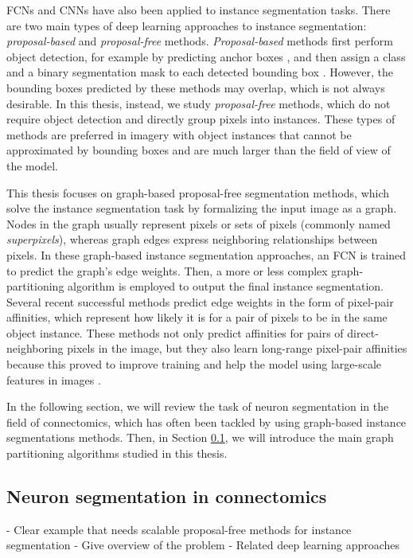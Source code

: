 FCNs and CNNs have also been applied to instance segmentation tasks.
There are two main types of deep learning approaches to instance segmentation: \emph{proposal-based} and \emph{proposal-free} methods. 
\emph{Proposal-based} methods first perform object detection, for example by predicting anchor boxes \cite{ren2015faster}, and then assign a class and a binary segmentation mask to each detected bounding box \cite{he2017mask,porzi2019seamless}.
However, the bounding boxes predicted by these methods may overlap, which is not always desirable. 
In this thesis, instead, we study \emph{proposal-free} methods, which do not require object detection and directly group pixels into instances. 
These types of methods are preferred in imagery with object instances that cannot be approximated by bounding boxes and are much larger than the field of view of the model. 

This thesis focuses on graph-based proposal-free segmentation methods, which solve the instance segmentation task by formalizing the input image as a graph. Nodes in the graph usually represent pixels or sets of pixels (commonly named \emph{superpixels}), whereas graph edges express neighboring relationships between pixels. In these graph-based instance segmentation approaches, an FCN is trained to predict the graph's edge weights. Then, a more or less complex graph-partitioning algorithm is employed to output the final instance segmentation. 
Several recent successful methods \cite{Gao_2019_ICCV,liu2018affinity,lee2017superhuman} predict edge weights in the form of pixel-pair affinities, which represent how likely it is for a pair of pixels to be in the same object instance. These methods not only predict affinities for pairs of direct-neighboring pixels in the image, but they also learn long-range pixel-pair affinities because this proved to improve training and help the model using large-scale features in images \cite{lee2017superhuman}.

In the following section, we will review the task of neuron segmentation in the field of connectomics, which has often been tackled by using graph-based instance segmentations methods. Then, in Section \ref{}, we will introduce the main graph partitioning algorithms studied in this thesis.



 
\subsection{Neuron segmentation in connectomics}
- Clear example that needs scalable proposal-free methods for instance segmentation
- Give overview of the problem
- Related deep learning approaches

